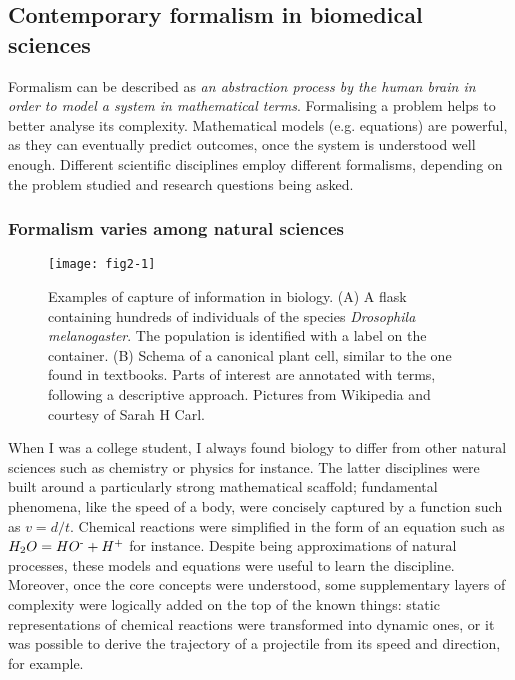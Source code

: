 \subsection{Contemporary formalism in biomedical sciences}

Formalism can be described as \emph{an abstraction process by the human brain in order to model a system in mathematical terms}. Formalising a problem helps to better analyse its complexity. Mathematical models (e.g. equations) are powerful, as they can eventually predict outcomes, once the system is understood well enough. Different scientific disciplines employ different formalisms, depending on the problem studied and research questions being asked.

\subsubsection{Formalism varies among natural sciences}

\begin{figure}[ht]
    \centering
    \texttt{[image: fig2-1]}
    \caption{Examples of capture of information in biology. (A) A flask containing hundreds of individuals of the species \emph{Drosophila melanogaster}. The population is identified with a label on the container. (B) Schema of a  canonical plant cell, similar to the one found in textbooks. Parts of interest are annotated with terms, following a descriptive approach. Pictures from Wikipedia and courtesy of Sarah H Carl.}
    \label{fig2-1}
\end{figure}

When I was a college student, I always found biology to differ from other natural sciences such as chemistry or physics for instance. The latter disciplines were built around a particularly strong mathematical scaffold; fundamental phenomena, like the speed of a body, were concisely captured by a function such as $ v=d/t $. Chemical reactions were simplified in the form of an equation such as $ H_{2}O = HO \textsuperscript{-} + H \textsuperscript{+} $ for instance. Despite being approximations of natural processes, these models and equations were useful to learn the discipline. Moreover, once the core concepts were understood, some supplementary layers of complexity were logically added on the top of the known things: static representations of chemical reactions were transformed into dynamic ones, or it was possible to derive the trajectory of a projectile from its speed and direction, for example.

